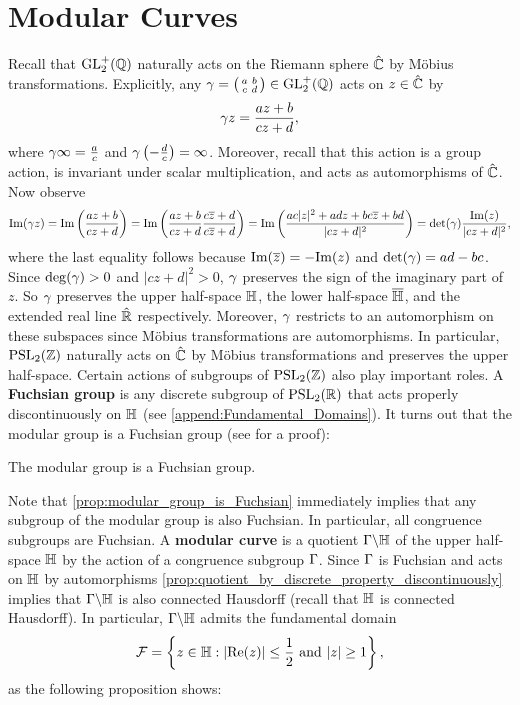   \section{Modular Curves}
    Recall that $\mathrm{GL}_{2}^{+}(\mathbb{Q})$ naturally acts on the Riemann sphere $\hat{\mathbb{C}}$ by M\"obius transformations. Explicitly, any $\gamma = \begin{psmallmatrix} a & b \\ c & d \end{psmallmatrix} \in \mathrm{GL}_{2}^{+}(\mathbb{Q})$ acts on $z \in \hat{\mathbb{C}}$ by
    \[
      \gamma z = \frac{az+b}{cz+d},
    \]
    where $\gamma \infty = \frac{a}{c}$ and $\gamma\left(-\frac{d}{c}\right) = \infty$. Moreover, recall that this action is a group action, is invariant under scalar multiplication, and acts as automorphisms of $\hat{\mathbb{C}}$. Now observe
    \[
      \mathrm{Im}(\gamma z) = \mathrm{Im}\left(\frac{az+b}{cz+d}\right) = \mathrm{Im}\left(\frac{az+b}{cz+d}\frac{c\overline{z}+d}{c\overline{z}+d}\right) = \mathrm{Im}\left(\frac{ac|z|^{2}+adz+bc\overline{z}+bd}{|cz+d|^{2}}\right) = \det(\gamma)\frac{\mathrm{Im}(z)}{|cz+d|^{2}},
    \]
    where the last equality follows because $\mathrm{Im}(\overline{z}) = -\mathrm{Im}(z)$ and $\det(\gamma) = ad-bc$. Since $\deg(\gamma) > 0$ and $|cz+d|^{2} > 0$, $\gamma$ preserves the sign of the imaginary part of $z$. So $\gamma$ preserves the upper half-space $\mathbb{H}$, the lower half-space $\overline{\mathbb{H}}$, and the extended real line $\hat{\mathbb{R}}$ respectively. Moreover, $\gamma$ restricts to an automorphism on these subspaces since M\"obius transformations are automorphisms. In particular, $\mathrm{PSL}_{2}(\mathbb{Z})$ naturally acts on $\hat{\mathbb{C}}$ by M\"obius transformations and preserves the upper half-space. Certain actions of subgroups of $\mathrm{PSL}_{2}(\mathbb{Z})$ also play important roles. A \textbf{Fuchsian group} is any discrete subgroup of $\mathrm{PSL}_{2}(\mathbb{R})$ that acts properly discontinuously on $\mathbb{H}$ (see \cref{append:Fundamental_Domains}). It turns out that the modular group is a Fuchsian group (see \cite{diamond2005first} for a proof):

    \begin{proposition}\label{prop:modular_group_is_Fuchsian}
      The modular group is a Fuchsian group.
    \end{proposition}

    Note that \cref{prop:modular_group_is_Fuchsian} immediately implies that any subgroup of the modular group is also Fuchsian. In particular, all congruence subgroups are Fuchsian. A \textbf{modular curve} is a quotient $\Gamma\backslash\mathbb{H}$ of the upper half-space $\mathbb{H}$ by the action of a congruence subgroup $\Gamma$. Since $\Gamma$ is Fuchsian and acts on $\mathbb{H}$ by automorphisms \cref{prop:quotient_by_discrete_property_discontinuously} implies that $\Gamma\backslash\mathbb{H}$ is also connected Hausdorff (recall that $\mathbb{H}$ is connected Hausdorff). In particular, $\Gamma\backslash\mathbb{H}$ admits the fundamental domain
    \[
      \mathcal{F} = \left\{z \in \mathbb{H}:\text{$|\mathrm{Re}(z)| \le \frac{1}{2}$ and $|z| \ge 1$}\right\},
    \]
    as the following proposition shows:

